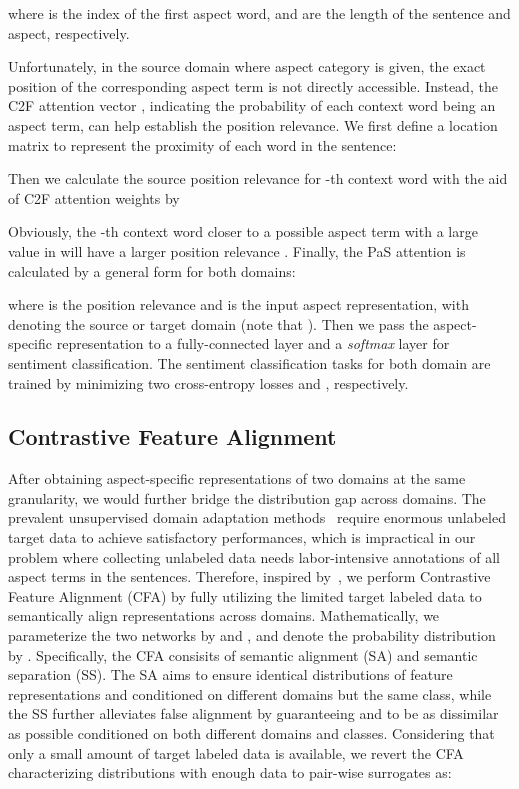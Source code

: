 \documentclass[letterpaper]{article} \usepackage{aaai19}  \usepackage{times}  \usepackage{latexsym}
\begin{document}
where  is  the index of the first aspect word,  and  are the length of the sentence and aspect, respectively. 

Unfortunately, in the source domain where aspect category is given, the exact position of the corresponding aspect term is not directly accessible. Instead, the C2F attention vector , indicating the probability of each context word being an aspect term, can help establish the position relevance. We first define a location matrix  to represent the proximity of each word in the sentence:

Then we calculate the source position relevance for -th context word with the aid of C2F attention weights by

Obviously, the -th context word closer to a possible aspect term with a large value in  will have a larger position relevance . Finally, the PaS attention is calculated by a general form for both domains: 

where  is the position relevance and  is the input aspect representation, with  denoting the source or target domain (note that ). Then we pass the aspect-specific representation  to a fully-connected layer and a {\it softmax} layer for sentiment classification. The sentiment classification tasks for both domain are trained by minimizing two cross-entropy losses  and , respectively.



\subsection{Contrastive Feature Alignment}
After obtaining aspect-specific representations of two domains at the same granularity, we would further bridge the distribution gap across domains.
The prevalent unsupervised domain adaptation methods~\cite{gretton2007kernel,ganin2016domain} require enormous unlabeled target data to achieve satisfactory performances, which is impractical in our problem where collecting unlabeled data needs labor-intensive annotations of all aspect terms in the sentences. 
Therefore, inspired by~\cite{motiian2017unified}, we perform Contrastive Feature Alignment (CFA) by fully utilizing the limited target labeled data to semantically align representations across domains. Mathematically, we parameterize the two networks by  and , and denote the probability distribution by . Specifically, the CFA consisits of semantic alignment (SA) and semantic separation (SS). The SA aims to ensure identical distributions of feature representations  and  conditioned on different domains but the same class,  while the SS further alleviates false alignment by guaranteeing  and  to be as dissimilar as possible conditioned on both different domains and classes. Considering that only a small amount of target labeled data is available, we revert the CFA characterizing distributions with enough data to pair-wise surrogates as: 
\end{document}
